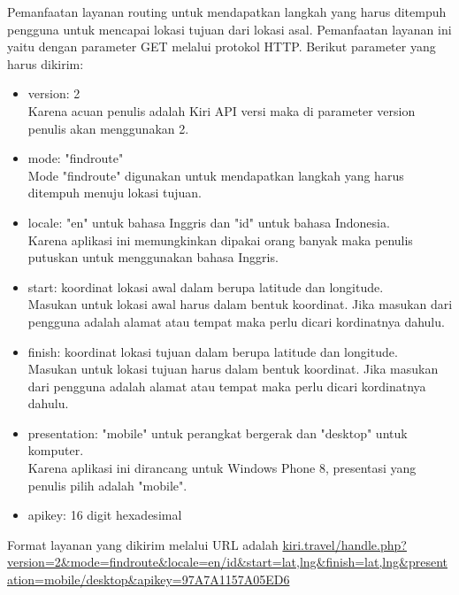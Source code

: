 \hspace{0.5cm} Pemanfaatan layanan routing untuk mendapatkan langkah yang harus ditempuh pengguna untuk mencapai lokasi tujuan dari lokasi asal. Pemanfaatan layanan ini yaitu dengan parameter GET melalui protokol HTTP. Berikut parameter yang harus dikirim:
\begin{itemize}
	\item version: 2 \\
	Karena acuan penulis adalah Kiri API versi maka di parameter version penulis akan menggunakan 2.
	\item mode: "findroute" \\
	Mode "findroute" digunakan untuk mendapatkan langkah yang harus ditempuh menuju lokasi tujuan.
	\item locale: "en" untuk bahasa Inggris dan "id" untuk bahasa Indonesia. \\
	Karena aplikasi ini memungkinkan dipakai orang banyak maka penulis putuskan untuk menggunakan bahasa Inggris.
	\item start: koordinat lokasi awal dalam berupa latitude dan longitude. \\
	Masukan untuk lokasi awal harus dalam bentuk koordinat. Jika masukan dari pengguna adalah alamat atau tempat maka perlu dicari kordinatnya dahulu.
	\item finish: koordinat lokasi tujuan dalam berupa latitude dan longitude. \\
	Masukan untuk lokasi tujuan harus dalam bentuk koordinat. Jika masukan dari pengguna adalah alamat atau tempat maka perlu dicari kordinatnya dahulu.
	\item presentation: "mobile" untuk perangkat bergerak dan "desktop" untuk komputer. \\
	Karena aplikasi ini dirancang untuk Windows Phone 8, presentasi yang penulis pilih adalah "mobile".
	\item apikey: 16 digit hexadesimal
\end{itemize}

Format layanan yang dikirim melalui URL adalah \url{kiri.travel/handle.php?version=2&mode=findroute&locale=en/id&start=lat,lng&finish=lat,lng&presentation=mobile/desktop&apikey=97A7A1157A05ED6}


